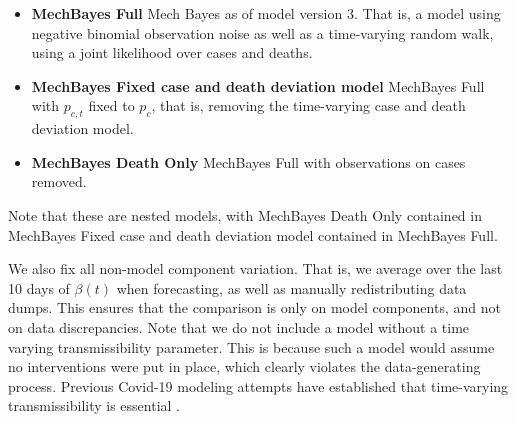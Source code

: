 \documentclass[11pt]{amsart}
\begin{document}
 \begin{itemize}
 \item \textbf{MechBayes Full} Mech Bayes as of model version 3. That is, a model using negative binomial observation noise as well as a time-varying random walk, using a joint likelihood over cases and deaths.
 
 \item \textbf{MechBayes Fixed case and death deviation model} MechBayes Full with $p_{c,t}$ fixed to $p_c$, that is, removing the time-varying case and death deviation model.
 
 \item \textbf{MechBayes Death Only} MechBayes Full with observations on cases removed.
 \end{itemize}
 
 Note that these are nested models, with MechBayes Death Only contained in MechBayes Fixed case and death deviation model contained in MechBayes Full. 
 
  
 We also fix all non-model component variation. That is, we average over the last 10 days of $\beta(t)$ when forecasting, as well as manually redistributing data dumps. This ensures that the comparison is only on model components, and not on data discrepancies. Note that we do not include a model without a time varying transmissibility parameter. This is because such a model would assume no interventions were put in place, which clearly violates the data-generating process. Previous Covid-19 modeling attempts have established that time-varying transmissibility is essential \cite{pei2020differential} \cite{abbott2020estimating}\cite{flaxman2020estimating} \cite{smirnova2019forecasting}.
\end{document}
